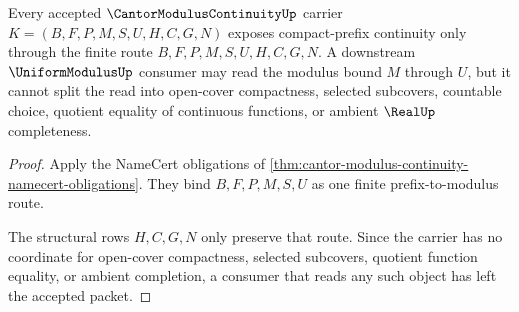 \begin{theorem}
\label{thm:cantor-modulus-continuity-compact-prefix-nonescape}
Every accepted $\CantorModulusContinuityUp$ carrier $K=(B,F,P,M,S,U,H,C,G,N)$ exposes compact-prefix continuity only through the finite route $B,F,P,M,S,U,H,C,G,N$. A downstream $\UniformModulusUp$ consumer may read the modulus bound $M$ through $U$, but it cannot split the read into open-cover compactness, selected subcovers, countable choice, quotient equality of continuous functions, or ambient $\RealUp$ completeness.
\end{theorem}
\begin{proof}
Apply the NameCert obligations of \autoref{thm:cantor-modulus-continuity-namecert-obligations}. They bind $B,F,P,M,S,U$ as one finite prefix-to-modulus route.

The structural rows $H,C,G,N$ only preserve that route. Since the carrier has no coordinate for open-cover compactness, selected subcovers, quotient function equality, or ambient completion, a consumer that reads any such object has left the accepted packet.
\end{proof}




